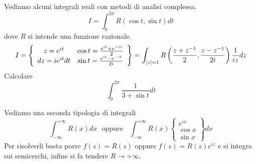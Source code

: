 Vediamo alcuni integrali reali con metodi di analisi complessa.
\begin{equation*}
I = \boxed{\int^{2\pi}_{0} R\left(\cos t, \sin t\right) dt}
\end{equation*}
dove $R$ si intende una funzione razionale.
\begin{equation*}
I = \left\{
\begin{array}{c c}
z = e^{it} & \cos t = \frac{e^{it} + e^{- it}}{2}\\
dz = ie^{it} dt & \sin t = \frac{e^{it} - e^{- it}}{2i}
\end{array}\right\} = \int_{\left| z\right| = 1} R\left(\frac{z + z^{- 1}}{2}, \frac{z - z^{- 1}}{2i}\right)\frac{1}{iz} dz
\end{equation*}
Calcolare
\begin{equation*}
\int^{2\pi}_{0}\frac{1}{3 + \sin t} dt
\end{equation*}
\Esercizio{}

Vediamo una seconda tipologia di integrali
\begin{equation*}
\boxed{\int^{+ \infty}_{- \infty} R\left(x\right) dx} \ \ \ \text{oppure} \ \ \ \ \boxed{\int^{+ \infty}_{- \infty} R\left(x\right)\left\{
\begin{array}{c}
e^{ix}\\
\cos x\\
\sin x
\end{array}\right\} dx}
\end{equation*}
Per risolverli basta porre $f\left(z\right) = R\left(z\right)$ oppure $f\left(z\right) = R\left(z\right) e^{iz}$ e si integra sui semicerchi, infine si fa tendere $R\rightarrow + \infty $.

